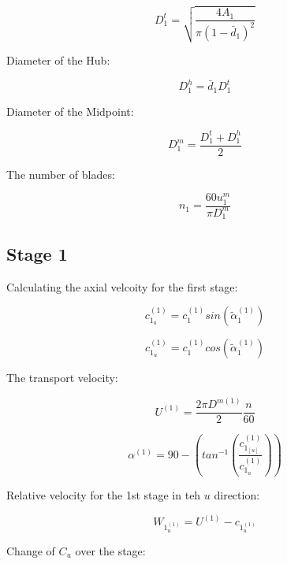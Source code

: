 \documentclass[titlepage]{article}
\begin{document}
\begin{equation}
    D_{1}^{t} = \sqrt{\frac{4A_{1}}{\pi (1- \bar{d}_{1})^{2}}}
\end{equation}

Diameter of the Hub:

\begin{equation}
    D_{1}^{h} = \bar{d}_{1} D_{1}^{t}
\end{equation}

Diameter of the Midpoint:

\begin{equation}
    D_{1}^{m} = \frac{D_{1}^{t} + D_{1}^{h}}{2}
\end{equation}

The number of blades:

\begin{equation}
    n_{1} = \frac{60 u_{1}^{m}}{\pi D_{1}^{m}}
\end{equation}

\subsection{Stage 1}

Calculating the axial velcoity for the first stage:

\begin{equation}
    c_{1_{a}}^{(1)} = c_{1}^{(1)} sin(\tilde{\alpha}_{1}^{(1)})
\end{equation}

\begin{equation}
    c_{1_{u}}^{(1)} = c_{1}^{(1)} cos(\tilde{\alpha}_{1}^{(1)})
\end{equation}

The transport velocity:

\begin{equation}
    U^{(1)} = \frac{2 \pi D^{m(1)}}{2} \frac{n}{60} 
\end{equation}

\begin{equation}
    \alpha^{(1)} = 90 - \left(tan^{-1}\left(\frac{c_{1_[u]}^{(1)}}{c_{1_{a}}^{(1)}}\right) \right)
\end{equation}

Relative velocity for the 1st stage in teh $u$ direction:

\begin{equation}
    W_{1_{u}^{(1)}} = U^{(1)} - c_{1_{u}^{(1)}}
\end{equation}

Change of $C_{u}$ over the stage:
\end{document}
